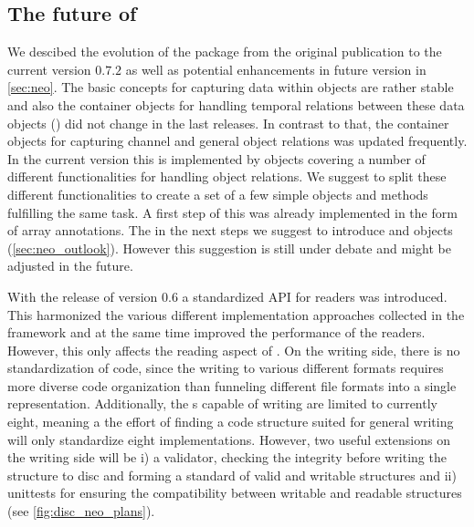 \subsection{The future of }
We descibed the evolution of the  package from the original publication \cite{Garcia_2014} to the current version $0.7.2$ as well as potential enhancements in future version in \cref{sec:neo}. The basic concepts for capturing data within  objects are rather stable and also the  container objects for handling temporal relations between these data objects () did not change in the last releases. In contrast to that, the container objects for capturing channel and general object relations was updated frequently. In the current  version this is implemented by  objects covering a number of different functionalities for handling object relations. We suggest to split these different functionalities to create a set of a few simple objects and methods fulfilling the same task. A first step of this was already implemented in the form of array annotations. The in the next steps we suggest to introduce  and  objects (\cref{sec:neo_outlook}). However this suggestion is still under debate and might be adjusted in the future. 

With the release of  version $0.6$ a standardized API for readers was introduced. This harmonized the various different implementation approaches collected in the  framework and at the same time improved the performance of the readers. However, this only affects the reading aspect of . On the writing side, there is no standardization of code, since the writing to various different formats requires more diverse code organization than funneling different file formats into a single representation. Additionally, the s capable of writing are limited to currently eight, meaning a the effort of finding a code structure suited for general writing will only standardize eight implementations. However, two useful extensions on the writing side will be i) a validator, checking the integrity before writing the  structure to disc and forming a standard of valid and writable  structures and ii) unittests for ensuring the compatibility between writable and readable  structures (see \cref{fig:disc_neo_plans}).


